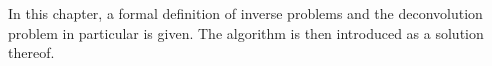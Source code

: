 In this chapter,
  a formal definition of
    inverse problems
    and the deconvolution problem in particular
  is given.
The \dsea{} algorithm is then introduced
  as a solution thereof.
